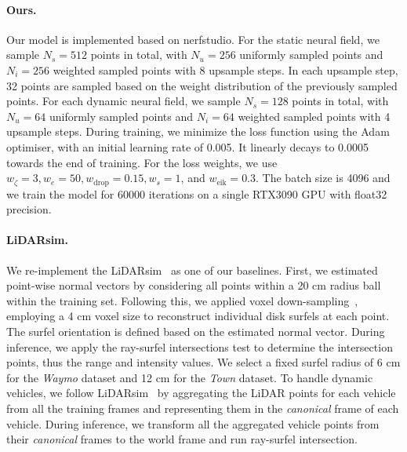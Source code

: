 \paragraph{Ours.} 
Our model is implemented based on nerfstudio\cite{nerfstudio}. For the static neural field, we sample $N_s=512$ points in total, with $N_u=256$ uniformly sampled points and $N_i=256$ weighted sampled points with 8 upsample steps. In each upsample step, 32 points are sampled based on the weight distribution of the previously sampled points. For each dynamic neural field, we sample $N_s=128$ points in total, with $N_u=64$ uniformly sampled points and $N_i=64$ weighted sampled points with 4 upsample steps. During training, we minimize the loss function using the Adam~\cite{kingma2014adam} optimiser, with an initial learning rate of 0.005. It linearly decays to 0.0005 towards the end of training. For the loss weights, we use $w_{\zeta}=3, w_{e}=50, w_{\text{drop}}=0.15, w_{s}=1$, and  $w_{\text{eik}}=0.3$. The batch size is 4096 and we train the model for 60000 iterations on a single RTX3090 GPU with float32 precision.

\paragraph{LiDARsim.} We re-implement the LiDARsim~\cite{manivasagam2020lidarsim} as one of our baselines. 
First, we estimated point-wise normal vectors by considering all points within a 20 cm radius ball within the training set. Following this, we applied voxel down-sampling~\cite{tang2022torchsparse}, employing a 4 cm voxel size to reconstruct individual disk surfels at each point. The surfel orientation is defined based on the estimated normal vector. During inference, we apply the ray-surfel intersections test to determine the intersection points, thus the range and intensity values. We select a fixed surfel radius of 6 cm for the \textit{Waymo} dataset and 12 cm for the \textit{Town} dataset.
To handle dynamic vehicles, we follow LiDARsim~\cite{manivasagam2020lidarsim} by aggregating the LiDAR points for each vehicle from all the training frames and representing them in the \textit{canonical} frame of each vehicle. During inference, we transform all the aggregated vehicle points from their \textit{canonical} frames to the world frame and run ray-surfel intersection.

